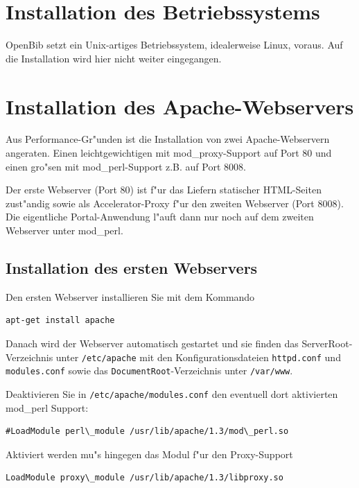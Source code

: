 \documentclass[11pt, twoside, a4paper, BCOR8mm, DIV12, bibtotoc,idxtotoc]{scrbook}
\begin{document}
\section{Installation des Betriebssystems}
OpenBib setzt ein Unix-artiges Betriebssystem, idealerweise Linux,
voraus. Auf die Installation wird hier nicht weiter eingegangen.


\section{Installation des Apache-Webservers}
Aus Performance-Gr"unden ist die Installation von zwei
Apache-Webservern angeraten. Einen leichtgewichtigen mit
mod\_proxy-Support auf Port 80 und einen gro"sen mit mod\_perl-Support
z.B. auf Port 8008. 

Der erste Webserver (Port 80) ist f"ur das Liefern statischer
HTML-Seiten zust"andig sowie als Accelerator-Proxy f"ur den zweiten
Webserver (Port 8008). Die eigentliche Portal-Anwendung l"auft dann
nur noch auf dem zweiten Webserver unter mod\_perl.


\subsection{Installation des ersten Webservers}

Den ersten Webserver installieren Sie mit dem Kommando

\begin{verbatim}
apt-get install apache
\end{verbatim}

Danach wird der Webserver automatisch gestartet und sie finden das
ServerRoot-Verzeichnis unter \texttt{/etc/apache} mit den Konfigurationsdateien
\texttt{httpd.conf} und \texttt{modules.conf} sowie das \texttt{DocumentRoot}-Verzeichnis unter
\texttt{/var/www}.

Deaktivieren Sie in \texttt{/etc/apache/modules.conf} den eventuell
dort aktivierten mod\_perl Support:

\begin{verbatim}
#LoadModule perl\_module /usr/lib/apache/1.3/mod\_perl.so
\end{verbatim}

Aktiviert werden mu"s hingegen das Modul f"ur den Proxy-Support

\begin{verbatim}
LoadModule proxy\_module /usr/lib/apache/1.3/libproxy.so
\end{verbatim}
\end{document}
